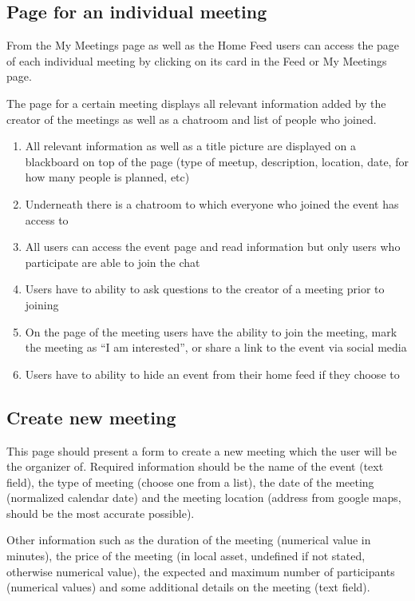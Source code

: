 \documentclass[conference]{IEEEtran}
\begin{document}
\subsection{Page for an individual meeting}

From the My Meetings page as well as the Home Feed users can access the page of each individual meeting by clicking on its card in the Feed or My Meetings page.

The page for a certain meeting displays all relevant information added by the creator of the meetings as well as a chatroom and list of people who joined.

\begin{enumerate}
\item All relevant information as well as a title picture are displayed on a blackboard on top of the page (type of meetup, description, location, date, for how many people is planned, etc)
\item Underneath there is a chatroom to which everyone who joined the event has access to
\item All users can access the event page and read information but only users who participate are able to join the chat
\item Users have to ability to ask questions to the creator of a meeting prior to joining
\item On the page of the meeting users have the ability to join the meeting, mark the meeting as “I am interested”, or share a link to the event via social media
\item Users have to ability to hide an event from their home feed if they choose to
\end{enumerate}

\subsection{Create new meeting}

This page should present a form to create a new meeting
which the user will be the organizer of. Required information should be the name of the event (text field), the type of meeting (choose one from a list), the date of the meeting (normalized calendar date) and the meeting location (address from google maps, should be the most accurate possible).

Other information such as the duration of the meeting (numerical value in minutes), the price of the meeting (in local asset, undefined if not stated, otherwise numerical value), the expected and maximum number of participants (numerical values) and some additional details on the meeting (text field).
\end{document}

